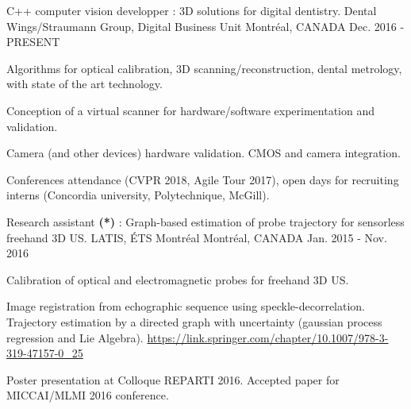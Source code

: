 


\begin{cventries}


\cventry
{C++ computer vision developper : 3D solutions for digital dentistry.}%
{Dental Wings/Straumann Group, Digital Business Unit} %
{Montréal, CANADA} %
{Dec. 2016 - PRESENT} %
{ %
\begin{cvitems}
\item {Algorithms for optical calibration, 3D scanning/reconstruction, dental metrology,  with state of the art technology.}
\item {Conception of a virtual scanner for hardware/software experimentation and validation.}
\item {Camera (and other devices) hardware validation. CMOS and camera integration.}
\item Conferences attendance (CVPR 2018, Agile Tour 2017), open days for recruiting interns (Concordia university, Polytechnique, McGill).
\end{cvitems}
}


\cventry
{Research assistant \textbf{(*)} : Graph-based estimation of probe trajectory for sensorless freehand 3D US.}%
{LATIS, ÉTS Montréal} %
{Montréal, CANADA} %
{Jan. 2015 - Nov. 2016} %
{ %
\begin{cvitems}
\item {Calibration of optical and electromagnetic probes for freehand 3D US.}
\item {Image registration from echographic sequence using speckle-decorrelation. Trajectory estimation by a directed graph with uncertainty (gaussian process regression and Lie Algebra). \url{https://link.springer.com/chapter/10.1007/978-3-319-47157-0_25}}
\item {Poster presentation at Colloque REPARTI 2016. Accepted paper for MICCAI/MLMI 2016 conference.}
\end{cvitems}
}


\end{cventries}
